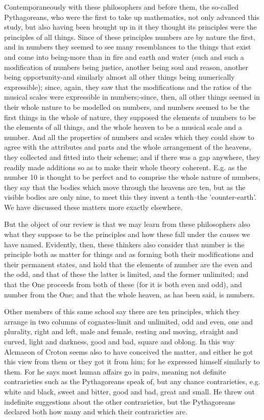 \documentclass{article}
\begin{document}
Contemporaneously with these philosophers and before them, the so-called Pythagoreans, who were the first to take up mathematics, not only advanced this study, but also having been brought up in it they thought its principles were the principles of all things. Since of these principles numbers are by nature the first, and in numbers they seemed to see many resemblances to the things that exist and come into being-more than in fire and earth and water (such and such a modification of numbers being justice, another being soul and reason, another being opportunity-and similarly almost all other things being numerically expressible); since, again, they saw that the modifications and the ratios of the musical scales were expressible in numbers;-since, then, all other things seemed in their whole nature to be modelled on numbers, and numbers seemed to be the first things in the whole of nature, they supposed the elements of numbers to be the elements of all things, and the whole heaven to be a musical scale and a number. And all the properties of numbers and scales which they could show to agree with the attributes and parts and the whole arrangement of the heavens, they collected and fitted into their scheme; and if there was a gap anywhere, they readily made additions so as to make their whole theory coherent. E.g. as the number 10 is thought to be perfect and to comprise the whole nature of numbers, they say that the bodies which move through the heavens are ten, but as the visible bodies are only nine, to meet this they invent a tenth--the 'counter-earth'. We have discussed these matters more exactly elsewhere.

But the object of our review is that we may learn from these philosophers also what they suppose to be the principles and how these fall under the causes we have named. Evidently, then, these thinkers also consider that number is the principle both as matter for things and as forming both their modifications and their permanent states, and hold that the elements of number are the even and the odd, and that of these the latter is limited, and the former unlimited; and that the One proceeds from both of these (for it is both even and odd), and number from the One; and that the whole heaven, as has been said, is numbers.

Other members of this same school say there are ten principles, which they arrange in two columns of cognates-limit and unlimited, odd and even, one and plurality, right and left, male and female, resting and moving, straight and curved, light and darkness, good and bad, square and oblong. In this way Alcmaeon of Croton seems also to have conceived the matter, and either he got this view from them or they got it from him; for he expressed himself similarly to them. For he says most human affairs go in pairs, meaning not definite contrarieties such as the Pythagoreans speak of, but any chance contrarieties, e.g. white and black, sweet and bitter, good and bad, great and small. He threw out indefinite suggestions about the other contrarieties, but the Pythagoreans declared both how many and which their contraricties are.
\end{document}
